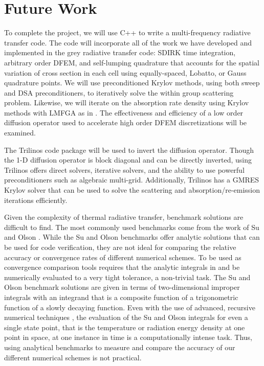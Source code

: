 \documentclass[final,3p,times]{elsarticle}
\begin{document}
\section{Future Work} 

To complete the project, we will use C++ to write a multi-frequency radiative transfer code.
The code will incorporate all of the work we have developed and implemented in the grey radiative transfer code: SDIRK time integration, arbitrary order DFEM, and self-lumping quadrature that accounts for the spatial variation of cross section in each cell using equally-spaced, Lobatto, or Gauss quadrature points.
We will use preconditioned Krylov methods, using both sweep and DSA \cite{mip_dsa} preconditioners, to iteratively solve the within group scattering problem.
Likewise, we will iterate on the absorption rate density using Krylov methods with LMFGA as in \cite{warsa_lmfga}.
The effectiveness and efficiency of a low order diffusion operator used to accelerate high order DFEM discretizations will be examined.

The Trilinos code package \cite{trilinos} will be used to invert the diffusion operator.
Though the 1-D diffusion operator is block diagonal and can be directly inverted, using Trilinos offers direct solvers, iterative solvers, and the ability to use powerful preconditioners such as algebraic multi-grid.
Additionally, Trilinos has a GMRES Krylov solver that can be used to solve the scattering and absorption/re-emission iterations efficiently.

Given the complexity of thermal radiative transfer, benchmark solutions are difficult to find.  
The most commonly used benchmarks come from the work of Su and Olson \cite{su_olson_1,su_olson_2}.
While the Su and Olson benchmarks offer analytic solutions that can be used for code verification, they are not ideal for comparing the relative accuracy or convergence rates of different numerical schemes.
To be used as convergence comparison tools requires that the analytic integrals in \cite{su_olson_1} and \cite{su_olson_2} be numerically evaluated to a very tight tolerance, a non-trivial task.
The Su and Olson benchmark solutions are given in terms of two-dimensional improper integrals with an integrand that is a composite function of a trigonometric function of a slowly decaying function.
Even with the use of advanced, recursive numerical techniques \cite{numerical_book}, the evaluation of the Su and Olson integrals for even a single state point, that is the temperature or radiation energy density at one point in space, at one instance in time is a computationally intense task.
Thus, using analytical benchmarks to measure and compare the accuracy of our different numerical schemes is not practical.
\end{document}
